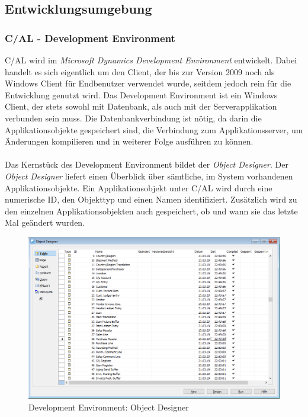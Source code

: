 \subsection{Entwicklungsumgebung}
\subsubsection{C/AL - Development Environment}
C/AL wird im \textit{Microsoft Dynamics Development Environment} entwickelt. Dabei handelt es sich eigentlich um den Client, der bis zur Version 2009 noch als Windows Client für Endbenutzer verwendet wurde, seitdem jedoch rein für die Entwicklung genutzt wird. Das Development Environment ist ein Windows Client, der stets sowohl mit Datenbank, als auch mit der Serverapplikation verbunden sein muss. Die Datenbankverbindung ist nötig, da darin die Applikationsobjekte gespeichert sind, die Verbindung zum Applikationsserver, um Änderungen kompilieren und in weiterer Folge ausführen zu können.

\paragraph{}
Das Kernstück des Development Environment bildet der \textit{Object Designer}. Der \textit{Object Designer} liefert einen Überblick über sämtliche, im System vorhandenen Applikationsobjekte. Ein Applikationsobjekt unter C/AL wird durch eine numerische ID, den Objekttyp und einen Namen identifiziert. Zusätzlich wird zu den einzelnen Applikationsobjekten auch gespeichert, ob und wann sie das letzte Mal geändert wurden.

\begin{figure}[h]
	\centering
	\includegraphics[width=130mm]{images/ObjectDesigner}
	\caption{Development Environment: Object Designer}
	\label{fig:ObjectDesigner}
\end{figure}

